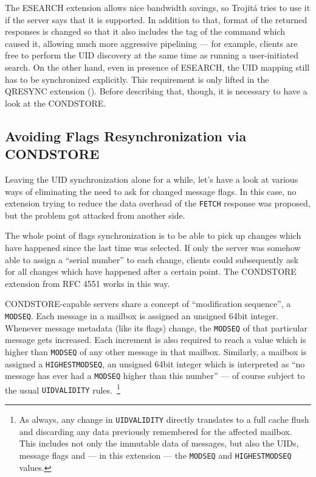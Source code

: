 \documentclass[trojita]{subfiles}
\begin{document}
The ESEARCH extension allows nice bandwidth savings, so Trojitá tries to use it if the server says that it is supported.
In addition to that, format of the returned responses is changed so that it also includes the tag of the command which
caused it, allowing much more aggressive pipelining --- for example, clients are free to perform the UID discovery at the
same time as running a user-initiated search.  On the other hand, even in presence of ESEARCH, the UID mapping still has
to be synchronized explicitly.  This requirement is only lifted in the QRESYNC extension
().  Before describing that, though, it is necessary to have a look at the CONDSTORE.

\subsection{Avoiding Flags Resynchronization via CONDSTORE}

Leaving the UID synchronization alone for a while, let's have a look at various ways of eliminating the need to ask for
changed message flags.  In this case, no extension trying to reduce the data overhead of the {\tt FETCH} response was
proposed, but the problem got attacked from another side.

The whole point of flags synchronization is to be able to pick up changes which have happened since the last time was
selected.  If only the server was somehow able to assign a ``serial number'' to each change, clients could subsequently
ask for all changes which have happened after a certain point.  The CONDSTORE extension from RFC 4551 \cite{rfc4551}
works in this way.

CONDSTORE-capable servers share a concept of ``modification sequence'', a {\tt MODSEQ}.  Each message in a mailbox is
assigned an unsigned 64bit integer.  Whenever message metadata (like its flags) change, the {\tt MODSEQ} of that
particular message gets increased.  Each increment is also required to reach a value which is higher than {\tt MODSEQ}
of any other message in that mailbox.  Similarly, a mailbox is assigned a {\tt HIGHESTMODSEQ}, an unsigned 64bit integer
which is interpreted as ``no message has ever had a {\tt MODSEQ} higher than this number'' --- of course subject to the
usual {\tt UIDVALIDITY} rules.~\footnote{As always, any change in {\tt UIDVALIDITY} directly translates to a full cache
flush and discarding any data previously remembered for the affected mailbox.  This includes not only the immutable data
of messages, but also the UIDs, message flags and --- in this extension --- the {\tt MODSEQ} and {\tt HIGHESTMODSEQ}
values.}
\end{document}
